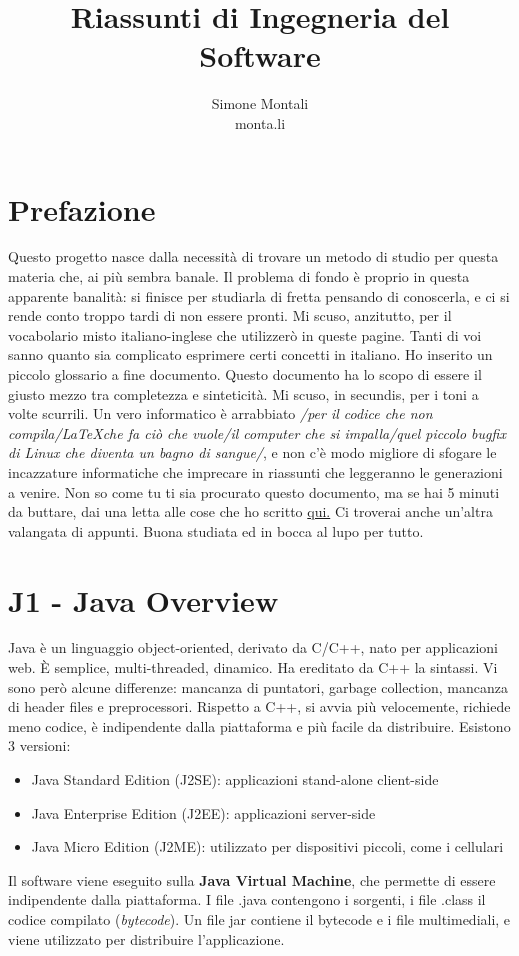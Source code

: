 \documentclass[11pt]{article}
\begin{document}
\author{Simone Montali\\monta.li}
\title{Riassunti di Ingegneria del Software}

\maketitle

\medskip
\section*{Prefazione}
Questo progetto nasce dalla necessità di trovare un metodo di studio per questa materia che, ai più sembra banale. Il problema di fondo è proprio in questa apparente banalità: si finisce per studiarla di fretta pensando di conoscerla, e ci si rende conto troppo tardi di non essere pronti. Mi scuso, anzitutto, per il vocabolario misto italiano-inglese che utilizzerò in queste pagine. Tanti di voi sanno quanto sia complicato esprimere certi concetti in italiano. Ho inserito un piccolo glossario a fine documento. Questo documento ha lo scopo di essere il giusto mezzo tra completezza e sinteticità. Mi scuso, in secundis, per i toni a volte scurrili. Un vero informatico è arrabbiato \textit{/per il codice che non compila/\LaTeX  che fa ciò che vuole/il computer che si impalla/quel piccolo bugfix di Linux che diventa un bagno di sangue/}, e non c'è modo migliore di sfogare le incazzature informatiche che imprecare in riassunti che leggeranno le generazioni a venire. 
Non so come tu ti sia procurato questo documento, ma se hai 5 minuti da buttare, dai una letta alle cose che ho scritto \href{https://monta.li/appunti}{qui.} Ci troverai anche un'altra valangata di appunti. Buona studiata ed in bocca al lupo per tutto.
\section{J1 - Java Overview}
Java è un linguaggio object-oriented, derivato da C/C++, nato per applicazioni web. È semplice, multi-threaded, dinamico. Ha ereditato da C++ la sintassi. Vi sono però alcune differenze: mancanza di puntatori, garbage collection, mancanza di header files e preprocessori. Rispetto a C++, si avvia più velocemente, richiede meno codice, è indipendente dalla piattaforma e più facile da distribuire. Esistono 3 versioni:
\begin{itemize}
    \item Java Standard Edition (J2SE): applicazioni stand-alone client-side
    \item Java Enterprise Edition (J2EE): applicazioni server-side
    \item Java Micro Edition (J2ME): utilizzato per dispositivi piccoli, come i cellulari
\end{itemize}
Il software viene eseguito sulla \textbf{Java Virtual Machine}, che permette di essere indipendente dalla piattaforma. I file .java contengono i sorgenti, i file .class il codice compilato (\textit{bytecode}). Un file jar contiene il bytecode e i file multimediali, e viene utilizzato per distribuire l'applicazione. 
\end{document}

